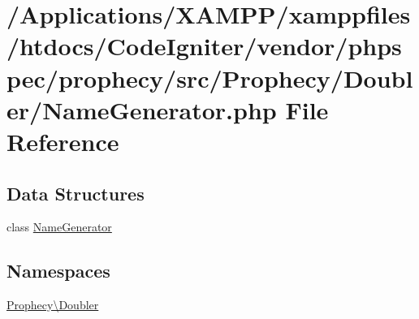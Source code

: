 \hypertarget{_name_generator_8php}{}\section{/\+Applications/\+X\+A\+M\+P\+P/xamppfiles/htdocs/\+Code\+Igniter/vendor/phpspec/prophecy/src/\+Prophecy/\+Doubler/\+Name\+Generator.php File Reference}
\label{_name_generator_8php}
\subsection*{Data Structures}
\begin{DoxyCompactItemize}
\item 
class \mbox{\hyperlink{class_prophecy_1_1_doubler_1_1_name_generator}{Name\+Generator}}
\end{DoxyCompactItemize}
\subsection*{Namespaces}
\begin{DoxyCompactItemize}
\item 
 \mbox{\hyperlink{namespace_prophecy_1_1_doubler}{Prophecy\textbackslash{}\+Doubler}}
\end{DoxyCompactItemize}
